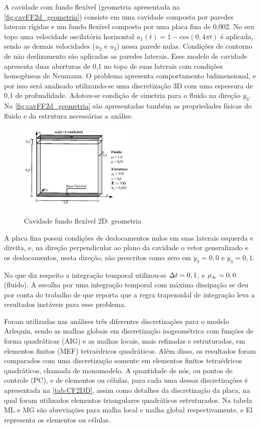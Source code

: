 A cavidade com fundo flexível (geometria apresentada na \autoref{fig:cavFF2d_geometria}) consiste em uma cavidade composta por paredes laterais rígidas e um fundo flexível composto por uma placa fina de 0,002. No seu topo uma velocidade oscilatória horizontal $u_1(t)=1-cos(0,4 \pi t)$ é aplicada, sendo as demais velocidades ($u_2$ e $u_3$) nessa parede nulas. Condições de contorno de não deslizamento são aplicadas as paredes laterais. Esse modelo de cavidade apresenta duas aberturas de 0,1 no topo de suas laterais com condições homogêneas de Neumann. O problema apresenta comportamento bidimensional, e por isso será analisado utilizando-se uma discretização 3D com uma espessura de 0,1 de profundidade. Adotou-se condição de simetria para o fluido na direção $y_3$.  Na \autoref{fig:cavFF2d_geometria} são apresentadas também as propriedades físicas do fluido e da estrutura necessárias a análise.

\begin{figure}[!htbp]
	\caption{Cavidade fundo flexível 2D: geometria}
	\centering 
	\includegraphics[scale=2.5,trim=0cm 0cm 0cm 0cm, clip=true]{Imagens/Cap7/cavFF2d_geometria.pdf}	
	\label{fig:cavFF2d_geometria}
\end{figure}

A placa fina possui condições de deslocamentos nulos em suas laterais esquerda e direita, e, na direção perpendicular ao plano da cavidade o vetor generalizado e os deslocamentos, nesta direção, são prescritos como zero em $y_3=0,0$ e $y_3=0,1$.

No que diz respeito a integração temporal utilizou-se $\Delta t = 0,1$, e $\rho_\infty = 0,0$ (fluido). A escolha por uma integração temporal com máxima dissipação se deu por conta do trabalho de  que reporta que a regra trapezoidal de integração leva a resultados instáveis para esse problema.

Foram utilizadas nas análises três diferentes discretizações para o modelo Arlequin, sendo as malhas globais em discretização isogeométrica com funções de forma quadráticas (AIG) e as malhas locais, mais refinadas e estruturadas, em elementos finitos (MEF) tetraédricos quadráticos. Além disso, os resultados foram comparados com uma discretização somente em elementos finitos tetraédricos quadráticos, chamada de monomodelo. A quantidade de nós, ou pontos de controle (PC), e de elementos ou células, para cada uma dessas discretizações é apresentada na \autoref{tab:CF2DD}, assim como detalhes da discretização da placa, na qual foram utilizados elementos triangulares quadráticos estruturados. Na tabela ML e MG são abreviações para malha local e malha global respectivamente, e El representa os elementos ou células.
	
